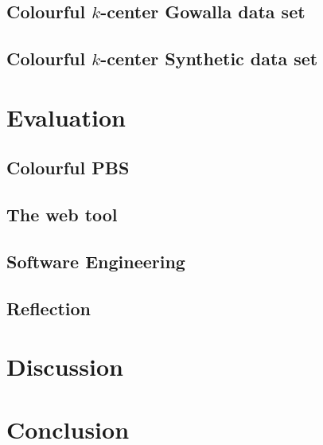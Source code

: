 \documentclass{article}
\begin{document}
    \subsection{Colourful \texorpdfstring{$k$}{k}-center Gowalla data set}\label{section:colourful_k_center_gowalla}
    
    
    \subsection{Colourful \texorpdfstring{$k$}{k}-center Synthetic data set}\label{section:colourful_k_center_synthetic}
    

\section{Evaluation}\label{section:evaluation}
    \subsection{Colourful PBS}
    
    
    \subsection{The web tool}
    
    
    \subsection{Software Engineering}
    
    
    \subsection{Reflection}
    
    
\section{Discussion}\label{section:discussion}


\section{Conclusion}\label{section:conclusion}

    
\end{document}
